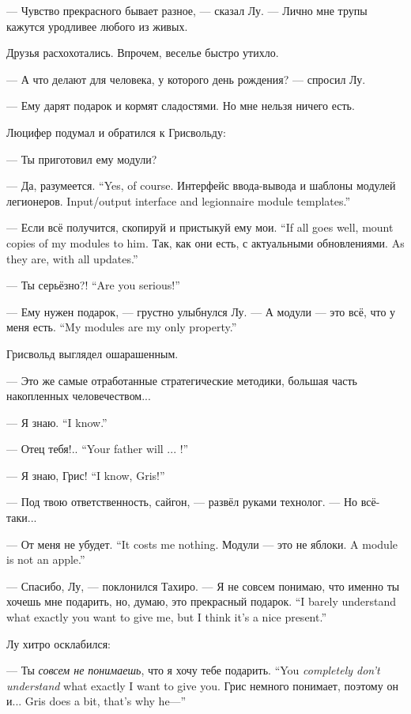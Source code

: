 --- Чувство прекрасного бывает разное, --- сказал Лу.
--- Лично мне трупы кажутся уродливее любого из живых.

Друзья расхохотались.
Впрочем, веселье быстро утихло.

--- А что делают для человека, у которого день рождения? --- спросил Лу.

--- Ему дарят подарок и кормят сладостями.
Но мне нельзя ничего есть.

Люцифер подумал и обратился к Грисвольду:

--- Ты приготовил ему модули?

{--- Да, разумеется.}
{``Yes, of course.}
{Интерфейс ввода-вывода и шаблоны модулей легионеров.}
{Input/output interface and legionnaire module templates.''}

{--- Если всё получится, скопируй и пристыкуй ему мои.}
{``If all goes well, mount copies of my modules to him.}
{Так, как они есть, с актуальными обновлениями.}
{As they are, with all updates.''}

{--- Ты серьёзно?!}
{``Are you serious!''}

--- Ему нужен подарок, --- грустно улыбнулся Лу.
{--- А модули --- это всё, что у меня есть.}
{``My modules are my only property.''}

Грисвольд выглядел ошарашенным.

--- Это же самые отработанные стратегические методики, большая часть накопленных человечеством...

{--- Я знаю.}
{``I know.''}

{--- Отец тебя!..}
{``Your father will ... !''}

{--- Я знаю, Грис!}
{``I know, Gris!''}

--- Под твою ответственность, сайгон, --- развёл руками технолог.
--- Но всё-таки...

{--- От меня не убудет.}
{``It costs me nothing.}
{Модули --- это не яблоки.}
{A module is not an apple.''}

--- Спасибо, Лу, --- поклонился Тахиро.
{--- Я не совсем понимаю, что именно ты хочешь мне подарить, но, думаю, это прекрасный подарок.}
{``I barely understand what exactly you want to give me, but I think it's a nice present.''}

Лу хитро осклабился:

{--- Ты \emph{совсем не понимаешь}, что я хочу тебе подарить.}
{``You \emph{completely don't understand} what exactly I want to give you.}
{Грис немного понимает, поэтому он и...}
{Gris does a bit, that's why he---''}

